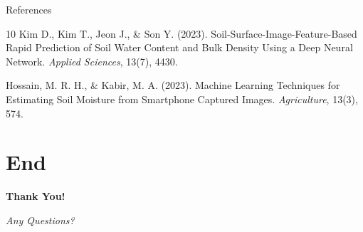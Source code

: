 \documentclass{beamer}
\begin{document}
\begin{frame}[allowframebreaks]{References}
\begin{thebibliography}{10}
		Kim D., Kim T., Jeon J., \& Son Y. (2023).
		\newblock Soil-Surface-Image-Feature-Based Rapid Prediction of Soil Water Content and Bulk Density Using a Deep Neural Network.
		\newblock \emph{Applied Sciences}, 13(7), 4430.
		
		Hossain, M. R. H., \& Kabir, M. A. (2023).
		\newblock Machine Learning Techniques for Estimating Soil Moisture from Smartphone Captured Images.
		\newblock \emph{Agriculture}, 13(3), 574.
		
	\end{thebibliography}
\end{frame}

\section*{End}
\begin{frame}
	\begin{center}
		\vspace{1.5cm}
		\Huge \textbf{Thank You!} 
		
		\vspace{1cm}
		\Large \textit{Any Questions?}
	\end{center}
\end{frame}
\end{document}
